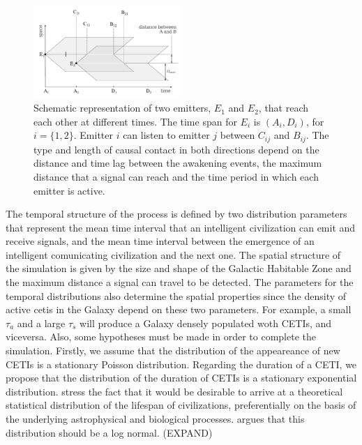 \documentclass[crop]{CSLB}%
\begin{document}
  
\begin{figure}
   \centering
   \includegraphics[width=0.5\textwidth]{abcd.pdf}
   \caption{Schematic representation of two emitters, $E_1$ and $E_2$,
   that reach each other at different times.  The time span for $E_i$
   is $(A_i, D_i)$, for $i=\{1,2\}$.  Emitter $i$ can listen to
   emitter $j$ between $C_{ij}$ and $B_{ij}$.
   The type and length of causal contact in both directions depend on
   the distance and time lag between the awakening events, the maximum
   distance that a signal can reach and the time period in which each
   emitter is active.}
   \label{F_abcd}
\end{figure}
                               

The temporal structure of the process is defined by two distribution
parameters that represent the mean time interval that an intelligent
civilization can emit and receive signals, and the mean time interval
between the emergence of an intelligent comunicating civilization and
the next one.
%
The spatial structure of the simulation is given by the size and shape
of the Galactic Habitable Zone and the maximum distance a signal can
travel to be detected.
%
The parameters for the temporal distributions also determine the
spatial properties since the density of active cetis in the Galaxy
depend on these two parameters.
%
For example, a small $\tau_a$ and a large $\tau_s$ will produce a
Galaxy densely populated woth CETIs, and viceversa.
%
Also, some hypotheses must be made in order to complete the
simulation.
%
Firstly, we assume that the distribution of the appeareance of new
CETIs is a stationary Poisson distribution.
%
Regarding the duration of a CETI, we propose that the distribution of
the duration of CETIs is a stationary exponential distribution.
%
\citet{balbi_impact_2018} stress the fact that it would be desirable to arrive
at a theoretical statistical distribution of the lifespan of
civilizations, preferentially on the basis of the underlying
astrophysical and biological processes.
%
\citet{maccone_lognormals_2014} argues that this distribution should be a log normal.
(EXPAND)
\end{document}
